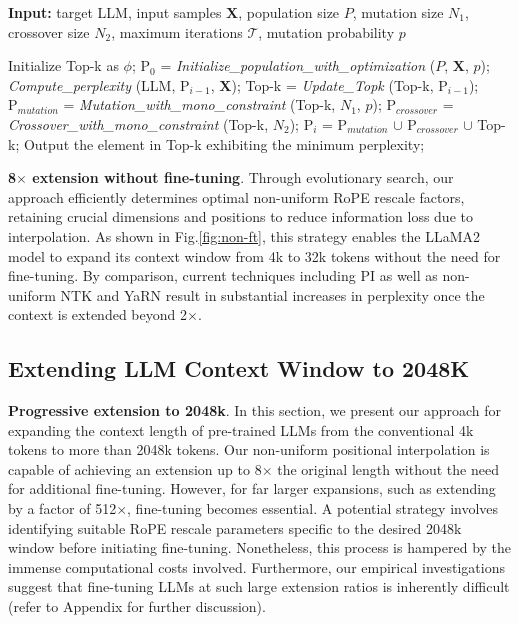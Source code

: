 \begin{algorithm}[t]
	\small
	\caption{The search algorithm}
	\textbf{Input:} target LLM, input samples $\mathbf{X}$, population size $P$, mutation size $N_1$, crossover size $N_2$, maximum iterations $\mathcal{T}$, mutation probability $p$\\

	\begin{algorithmic}[1]
		\label{alg:search}
		\STATE Initialize Top-k as $\phi$;	
		\STATE $\text{P}_0$ = \textit{Initialize\_population\_with\_optimization} ($P$, $\mathbf{X}$, $p$); 
		\STATE \textit{Compute\_perplexity} (LLM, $\text{P}_{i-1}$, $\mathbf{X}$);
		\STATE Top-k = \textit{Update\_Topk} (Top-k, $\text{P}_{i-1}$);
		\STATE $\text{P}_{mutation}$ = \textit{Mutation\_with\_mono\_constraint} (Top-k, $N_1$, $p$); 
		\STATE $\text{P}_{crossover}$ = \textit{Crossover\_with\_mono\_constraint} (Top-k, $N_2$);
		\STATE $\text{P}_i$ = $\text{P}_{mutation}$ $\cup$ $\text{P}_{crossover}$ $\cup$ Top-k;
		\ENDFOR
		\STATE Output the element in Top-k exhibiting the minimum perplexity;
	\end{algorithmic}
\end{algorithm}

\textbf{8$\times$ extension without fine-tuning}. Through evolutionary search, our approach efficiently determines optimal non-uniform RoPE rescale factors, retaining crucial dimensions and positions to reduce information loss due to interpolation. As shown in Fig.\ref{fig:non-ft}, this strategy enables the LLaMA2 model to expand its context window from 4k to 32k tokens without the need for fine-tuning. By comparison, current techniques including PI as well as non-uniform NTK and YaRN result in substantial increases in perplexity once the context is extended beyond 2$\times$.

\subsection{Extending LLM Context Window to 2048K}
\label{sec:extendto2048k}

\textbf{Progressive extension to 2048k}. In this section, we present our approach for expanding the context length of pre-trained LLMs from the conventional 4k tokens to more than 2048k tokens. Our non-uniform positional interpolation is capable of achieving an extension up to 8$\times$ the original length without the need for additional fine-tuning. However, for far larger expansions, such as extending by a factor of 512$\times$, fine-tuning becomes essential. A potential strategy involves identifying suitable RoPE rescale parameters specific to the desired 2048k window before initiating fine-tuning. Nonetheless, this process is hampered by the immense computational costs involved. Furthermore, our empirical investigations suggest that fine-tuning LLMs at such large extension ratios is inherently difficult (refer to Appendix for further discussion).

